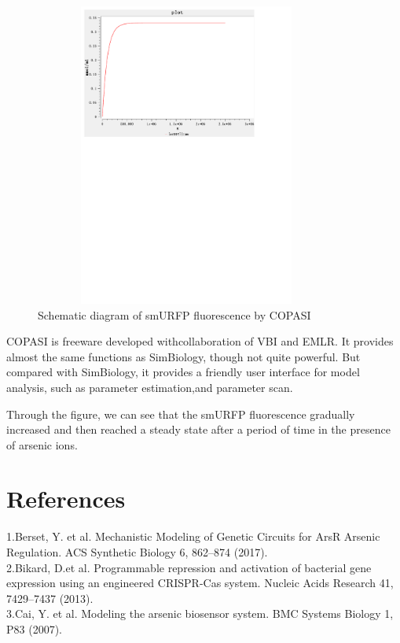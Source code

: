 \begin{figure}[h]
	\centering
	\includegraphics[width=10cm,height=10cm]{smuRFP}
	\caption{Schematic diagram of smURFP fluorescence by COPASI}
\end{figure}



COPASI is freeware developed withcollaboration of VBI and EMLR. It provides
almost the same functions as SimBiology, though not quite powerful. But compared with SimBiology, it provides a friendly user interface for model analysis, such as parameter estimation,and parameter scan.

Through the figure, we can see that the smURFP fluorescence gradually increased and then reached a steady state after a period of time  in the presence of arsenic ions.

\section{References} 
1.Berset, Y. et al. Mechanistic Modeling of Genetic Circuits for ArsR Arsenic Regulation. ACS Synthetic Biology 6, 862–874 (2017).\\

2.Bikard, D.et al. Programmable repression and activation of bacterial gene expression using an engineered CRISPR-Cas system. Nucleic Acids Research 41, 7429–7437 (2013).\\

3.Cai, Y. et al. Modeling the arsenic biosensor system. BMC Systems Biology 1, P83 (2007).\\

